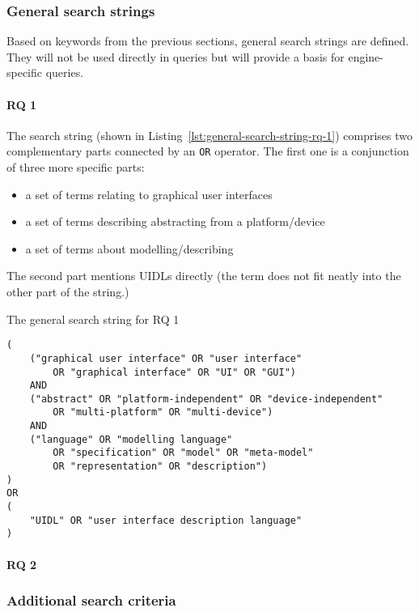 \subsubsection{General search strings}

Based on keywords from the previous sections, general search strings are defined.
They will not be used directly in queries but will provide a basis for engine-specific queries.

\paragraph{RQ 1}

The search string (shown in Listing~\ref{lst:general-search-string-rq-1})
comprises two complementary parts connected by an \texttt{OR} operator.
The first one is a conjunction of three more specific parts:
\begin{itemize}
    \item a set of terms relating to graphical user interfaces
    \item a set of terms describing abstracting from a platform/device
    \item a set of terms about modelling/describing
\end{itemize}
The second part mentions UIDLs directly (the term does not fit neatly into the other part of the string.)

\begin{listing}
    \caption{The general search string for RQ 1}
    \begin{verbatim}
(
    ("graphical user interface" OR "user interface"
        OR "graphical interface" OR "UI" OR "GUI")
    AND
    ("abstract" OR "platform-independent" OR "device-independent"
        OR "multi-platform" OR "multi-device")
    AND
    ("language" OR "modelling language"
        OR "specification" OR "model" OR "meta-model"
        OR "representation" OR "description")
)
OR
(
    "UIDL" OR "user interface description language"
)
    \end{verbatim}
    \label{lst:general-search-string-rq-1}
\end{listing}

\paragraph{RQ 2}

\subsubsection{Additional search criteria}

